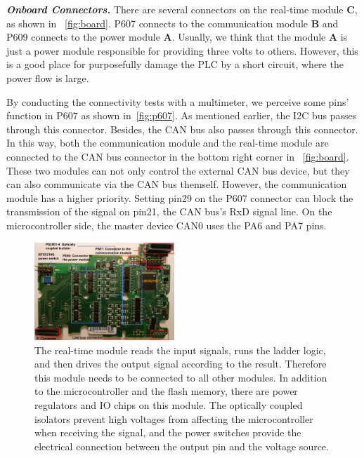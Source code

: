 \textbf{\textit{Onboard Connectors.}} There are several connectors on the real-time module \textbf{C}, as shown in ~\autoref{fig:board}. P607 connects to the communication module \textbf{B} and P609 connects to the power module \textbf{A}. Usually, we think that the module \textbf{A} is just a power module responsible for providing three volts to others. However, this is a good place for purposefully damage the PLC by a short circuit, where the power flow is large.

By conducting the connectivity tests with a multimeter, we perceive some pins' function in P607 as shown in~\autoref{fig:p607}. As mentioned earlier, the I2C bus passes through this connector. Besides, the CAN bus also passes through this connector. In this way, both the communication module and the real-time module are connected to the CAN bus connector in the bottom right corner in ~\autoref{fig:board}. These two modules can not only control the external CAN bus device, but they can also communicate via the CAN bus themself. However, the communication module has a higher priority. Setting pin29 on the P607 connector can block the transmission of the signal on pin21, the CAN bus's RxD signal line. On the microcontroller side, the master device CAN0 uses the PA6 and PA7 pins. 


\begin{figure}[th]
	\includegraphics[width=0.47\textwidth]{figures/board3}
	\centering
	\caption{The real-time module reads the input signals, runs the ladder logic, and then drives the output signal according to the result. Therefore this module needs to be connected to all other modules. In addition to the microcontroller and the flash memory, there are power regulators and IO chips on this module. The optically coupled isolators prevent high voltages from affecting the microcontroller when receiving the signal, and the power switches provide the electrical connection between the output pin and the voltage source.}
	\label{fig:board}
\end{figure}


